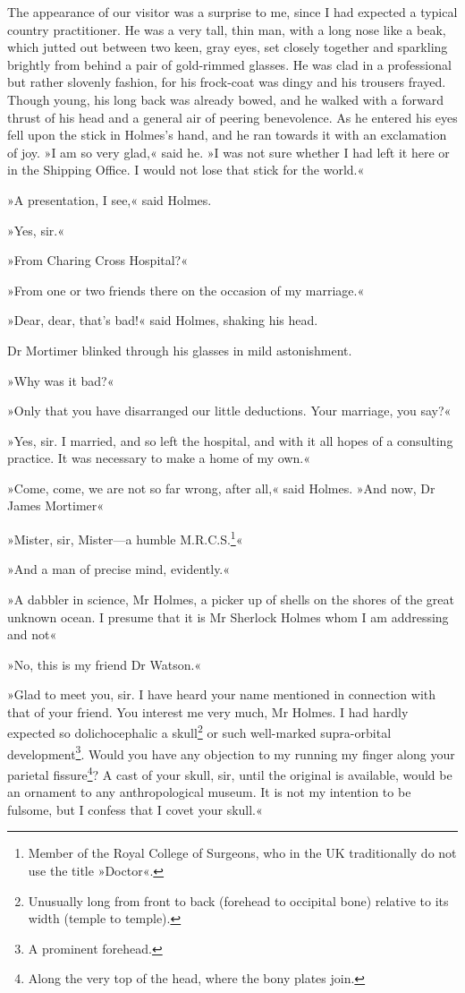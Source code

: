 The appearance of our visitor was a surprise to me, since I had expected a typical country practitioner. He was a very tall, thin man, with a long nose like a beak, which jutted out between two keen, gray eyes, set closely together and sparkling brightly from behind a pair of gold-rimmed glasses. He was clad in a professional but rather slovenly fashion, for his frock-coat was dingy and his trousers frayed. Though young, his long back was already bowed, and he walked with a forward thrust of his head and a general air of peering benevolence. As he entered his eyes fell upon the stick in Holmes's hand, and he ran towards it with an exclamation of joy. »I am so very glad,« said he. »I was not sure whether I had left it here or in the Shipping Office. I would not lose that stick for the world.«

»A presentation, I see,« said Holmes.

»Yes, sir.«

»From Charing Cross Hospital?«

»From one or two friends there on the occasion of my marriage.«

»Dear, dear, that's bad!« said Holmes, shaking his head.

Dr Mortimer blinked through his glasses in mild astonishment.

»Why was it bad?«

»Only that you have disarranged our little deductions. Your marriage, you say?«

»Yes, sir. I married, and so left the hospital, and with it all hopes of a consulting practice. It was necessary to make a home of my own.«

»Come, come, we are not so far wrong, after all,« said Holmes. »And now, Dr James Mortimer\longdash «

»Mister, sir, Mister\allowbreak---\allowbreak a humble M.R.C.S.\footnote{Member of the Royal College of Surgeons, who in the UK traditionally do not use the title »Doctor«.}«

»And a man of precise mind, evidently.«

»A dabbler in science, Mr Holmes, a picker up of shells on the shores of the great unknown ocean. I presume that it is Mr Sherlock Holmes whom I am addressing and not\longdash «

»No, this is my friend Dr Watson.«

»Glad to meet you, sir. I have heard your name mentioned in connection with that of your friend. You interest me very much, Mr Holmes. I had hardly expected so dolichocephalic a skull\footnote{Unusually long from front to back (forehead to occipital bone) relative to its width (temple to temple).} or such well-marked supra-orbital development\footnote{A prominent forehead.}. Would you have any objection to my running my finger along your parietal fissure\footnote{Along the very top of the head, where the bony plates join.}? A cast of your skull, sir, until the original is available, would be an ornament to any anthropological museum. It is not my intention to be fulsome, but I confess that I covet your skull.«

